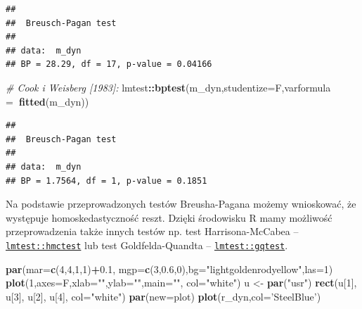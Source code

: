 \documentclass[polish,]{book}
\newenvironment{Shaded}{\begin{snugshade}}{\end{snugshade}}
\newcommand{\CommentTok}[1]{\textcolor[rgb]{0.56,0.35,0.01}{\textit{#1}}}
\newcommand{\DataTypeTok}[1]{\textcolor[rgb]{0.13,0.29,0.53}{#1}}
\newcommand{\DecValTok}[1]{\textcolor[rgb]{0.00,0.00,0.81}{#1}}
\newcommand{\FloatTok}[1]{\textcolor[rgb]{0.00,0.00,0.81}{#1}}
\newcommand{\KeywordTok}[1]{\textcolor[rgb]{0.13,0.29,0.53}{\textbf{#1}}}
\newcommand{\NormalTok}[1]{#1}
\newcommand{\OperatorTok}[1]{\textcolor[rgb]{0.81,0.36,0.00}{\textbf{#1}}}
\newcommand{\StringTok}[1]{\textcolor[rgb]{0.31,0.60,0.02}{#1}}
\begin{document}
\begin{verbatim}
## 
##  Breusch-Pagan test
## 
## data:  m_dyn
## BP = 28.29, df = 17, p-value = 0.04166
\end{verbatim}

\begin{Shaded}
\begin{Highlighting}[]
\CommentTok{# Cook i Weisberg [1983]:}
\NormalTok{lmtest}\OperatorTok{::}\KeywordTok{bptest}\NormalTok{(m_dyn,}\DataTypeTok{studentize=}\NormalTok{F,}\DataTypeTok{varformula =}\OperatorTok{~}\KeywordTok{fitted}\NormalTok{(m_dyn))}
\end{Highlighting}
\end{Shaded}

\begin{verbatim}
## 
##  Breusch-Pagan test
## 
## data:  m_dyn
## BP = 1.7564, df = 1, p-value = 0.1851
\end{verbatim}

Na podstawie przeprowadzonych testów Breusha-Pagana możemy wnioskować, że
występuje homoskedastyczność reszt. Dzięki środowisku R mamy możliwość przeprowadzenia także innych testów np. test Harrisona-McCabea -- \href{https://rdrr.io/cran/lmtest/man/hmctest.html}{\texttt{lmtest::hmctest}}
lub test Goldfelda-Quandta -- \href{https://rdrr.io/cran/lmtest/man/gqtest.html}{\texttt{lmtest::gqtest}}.

\begin{Shaded}
\begin{Highlighting}[]
\KeywordTok{par}\NormalTok{(}\DataTypeTok{mar=}\KeywordTok{c}\NormalTok{(}\DecValTok{4}\NormalTok{,}\DecValTok{4}\NormalTok{,}\DecValTok{1}\NormalTok{,}\DecValTok{1}\NormalTok{)}\OperatorTok{+}\FloatTok{0.1}\NormalTok{, }\DataTypeTok{mgp=}\KeywordTok{c}\NormalTok{(}\DecValTok{3}\NormalTok{,}\FloatTok{0.6}\NormalTok{,}\DecValTok{0}\NormalTok{),}\DataTypeTok{bg=}\StringTok{"lightgoldenrodyellow"}\NormalTok{,}\DataTypeTok{las=}\DecValTok{1}\NormalTok{)}
\KeywordTok{plot}\NormalTok{(}\DecValTok{1}\NormalTok{,}\DataTypeTok{axes=}\NormalTok{F,}\DataTypeTok{xlab=}\StringTok{""}\NormalTok{,}\DataTypeTok{ylab=}\StringTok{""}\NormalTok{,}\DataTypeTok{main=}\StringTok{""}\NormalTok{, }\DataTypeTok{col=}\StringTok{"white"}\NormalTok{)}
\NormalTok{u <-}\StringTok{ }\KeywordTok{par}\NormalTok{(}\StringTok{"usr"}\NormalTok{)}
\KeywordTok{rect}\NormalTok{(u[}\DecValTok{1}\NormalTok{], u[}\DecValTok{3}\NormalTok{], u[}\DecValTok{2}\NormalTok{], u[}\DecValTok{4}\NormalTok{], }\DataTypeTok{col=}\StringTok{"white"}\NormalTok{)}
\KeywordTok{par}\NormalTok{(}\DataTypeTok{new=}\NormalTok{plot)}
\KeywordTok{plot}\NormalTok{(r_dyn,}\DataTypeTok{col=}\StringTok{'SteelBlue'}\NormalTok{)}
\end{Highlighting}
\end{Shaded}
\end{document}
